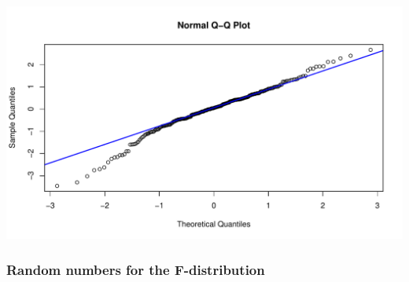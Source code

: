 \documentclass[oneside]{book}\usepackage[]{graphicx}\usepackage[dvipsnames,table,xcdraw]{xcolor}
\makeatletter
\def\maxwidth{ %
  \ifdim\Gin@nat@width>\linewidth
    \linewidth
  \else
    \Gin@nat@width
  \fi
}
\newenvironment{knitrout}{}{} %
\makeatother
\begin{document}
\begin{knitrout}
{\centering \includegraphics[width=\maxwidth]{figure/unnamed-chunk-58-2} 

}


\end{knitrout}

\subsubsection{Random numbers for the F-distribution}
\end{document}
